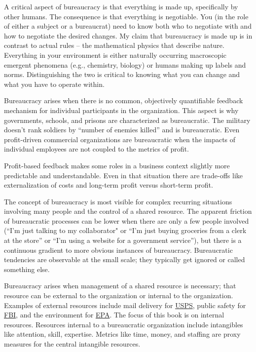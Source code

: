 A critical aspect of bureaucracy is that everything is made up, specifically by other humans. The consequence is that everything is negotiable. You (in the role of either a subject or a bureaucrat) need to know both who to negotiate with and how to negotiate the desired changes. My claim that bureaucracy is made up is in contrast to actual rules -- the mathematical physics that describe nature. Everything in your environment is either naturally occurring macroscopic emergent phenomena (e.g., chemistry, biology) or humans making up labels and norms. Distinguishing the two is critical to knowing what you can change and what you have to operate within. 

Bureaucracy arises when there is no common, objectively quantifiable feedback mechanism for individual participants in the organization. This aspect is why governments, schools, and prisons are characterized as bureaucratic. The military doesn't rank soldiers by ``number of enemies killed'' and is bureaucratic. Even profit-driven commercial organizations are bureaucratic when the impacts of individual employees are not coupled to the metrics of profit. 

Profit-based feedback makes some roles in a business context slightly more predictable and understandable. Even in that situation there are trade-offs like externalization of costs and long-term profit versus short-term profit. 

The concept of bureaucracy is most visible for complex recurring situations involving many people and the control of a shared resource. The apparent friction of bureaucratic processes can be lower when there are only a few people involved (``I'm just talking to my collaborator" or ``I'm just buying groceries from a clerk at the store'' or ``I'm using a website for a government service''), but there is a continuous gradient to more obvious instances of bureaucracy. Bureaucratic tendencies are observable at the small scale; they typically get ignored or called something else.

Bureaucracy arises when management of a shared resource is necessary; that resource can be external to the organization or internal to the organization. Examples of external resources include mail delivery for \href{https://en.wikipedia.org/wiki/United_States_Postal_Service}{USPS}, public safety for \href{https://en.wikipedia.org/wiki/Federal_Bureau_of_Investigation}{FBI}, and the environment for \href{https://en.wikipedia.org/wiki/United_States_Environmental_Protection_Agency}{EPA}. The focus of this book is on internal resources. Resources internal to a bureaucratic organization include intangibles like attention, skill, expertise. Metrics like time, money, and staffing are proxy measures for the central intangible resources.




